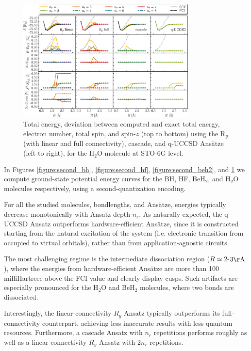 \documentclass[aps,pra,onecolumn]{revtex4-2}
\newcommand{\ry}{R_y}
\newcommand{\ang}{\mathrm{\AA}}
\begin{document}
\begin{figure}[t!]
\includegraphics[width=0.8\textwidth]{../figures/second_quantization_h2o/second_quantization_h2o.eps}
\caption{Total energy, deviation between computed and exact total energy, electron number, total spin, and spin-$z$ (top to bottom) 
using the R$_y$ (with linear and full connectivity), cascade, and q-UCCSD Ans\"{a}tze (left to right), for the H$_2$O molecule at STO-6G level.}
\label{figure:second_h2o}
\end{figure} 


In Figures \ref{figure:second_bh}, \ref{figure:second_hf}, \ref{figure:second_beh2}, and \ref{figure:second_h2o} we compute ground-state potential energy curves
for the BH, HF, BeH$_2$, and H$_2$O molecules respectively, using a second-quantization encoding.

For all the studied molecules, bondlengths, and Ans\"{a}tze, energies typically decrease monotonically with Ansatz depth $n_r$. 
As naturally expected, the q-UCCSD Ansatz outperforms hardware-efficient Ans\"{a}tze, 
since it is constructed starting from the natural excitation of the system (i.e. electronic transition from occupied to virtual orbitals), rather than from application-agnostic circuits. 

The most challenging regime is the intermediate dissociation region ($R \simeq 2$-$3 \ang$), 
where the energies from hardware-efficient Ans\"{a}tze are more than 100 milliHartreee above the FCI value and clearly display cusps.
Such artifacts are especially pronounced for the H$_2$O and BeH$_2$ molecules, where two bonds are dissociated.

Interestingly, the linear-connectivity $\ry$ Ansatz typically outperforms its full-connectivity counterpart, achieving less inaccurate results with less quantum resources.
Furthermore, a cascade Ansatz with $n_r$ repetitions performs roughly as well as a linear-connectivity $\ry$ Ansatz with $2 n_r$ repetitions.
\end{document}
